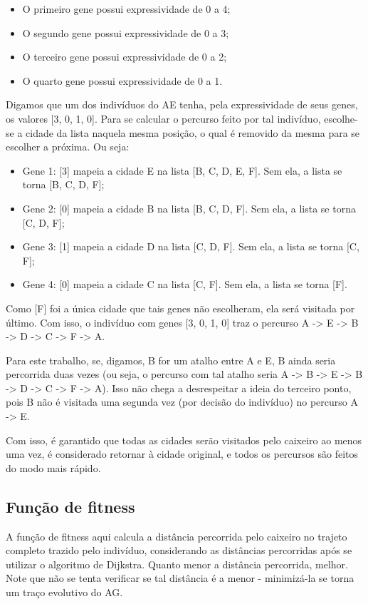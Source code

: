 \begin{itemize}
	\item O primeiro gene possui expressividade de 0 a 4;
	\item O segundo gene possui expressividade de 0 a 3;
	\item O terceiro gene possui expressividade de 0 a 2;
	\item O quarto gene possui expressividade de 0 a 1.
\end{itemize}

Digamos que um dos indivíduos do AE tenha, pela expressividade de seus genes, os valores [3, 0, 1, 0]. Para se calcular o percurso feito por tal indivíduo, escolhe-se a cidade da lista naquela mesma posição, o qual é removido da mesma para se escolher a próxima. Ou seja:

\begin{itemize}
	\item Gene 1: [3] mapeia a cidade E na lista [B, C, D, E, F]. Sem ela, a lista se torna [B, C, D, F];
	\item Gene 2: [0] mapeia a cidade B na lista [B, C, D, F]. Sem ela, a lista se torna [C, D, F];
	\item Gene 3: [1] mapeia a cidade D na lista [C, D, F]. Sem ela, a lista se torna [C, F];
	\item Gene 4: [0] mapeia a cidade C na lista [C, F]. Sem ela, a lista se torna [F].
\end{itemize}

Como [F] foi a única cidade que tais genes não escolheram, ela será visitada por último. Com isso, o indivíduo com genes [3, 0, 1, 0] traz o percurso A -> E -> B -> D -> C -> F -> A.

Para este trabalho, se, digamos, B for um atalho entre A e E, B ainda seria percorrida duas vezes (ou seja, o percurso com tal atalho seria A -> B -> E -> B -> D -> C -> F -> A). Isso não chega a desrespeitar a ideia do terceiro ponto, pois B não é visitada uma segunda vez (por decisão do indivíduo) no percurso A -> E.

Com isso, é garantido que todas as cidades serão visitados pelo caixeiro ao menos uma vez, é considerado retornar à cidade original, e todos os percursos são feitos do modo mais rápido.

\subsection*{Função de fitness}

A função de fitness aqui calcula a distância percorrida pelo caixeiro no trajeto completo trazido pelo indivíduo, considerando as distâncias percorridas após se utilizar o algoritmo de Dijkstra. Quanto menor a distância percorrida, melhor. Note que não se tenta verificar se tal distância é a menor - minimizá-la se torna um traço evolutivo do AG.
